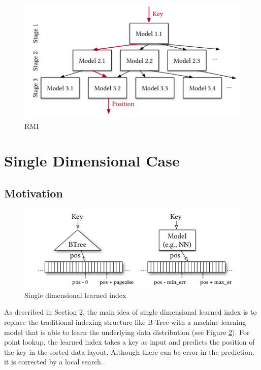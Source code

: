 \documentclass[sigconf,10pt]{acmart}
\begin{document}
\begin{figure}
  \includegraphics[scale=0.6]{../figures/RMI}
  \caption{RMI\cite{Learned_Index}}
  \label{RMI}
\end{figure}

\section{Single Dimensional Case}

\subsection{Motivation}

\begin{figure}[h]
  \includegraphics[scale=0.6]{../figures/single-dim-learned-index}
  \caption{Single dimensional learned index \cite{Learned_Index}}
  \label{single-dimensional-learned-index}
\end{figure}

As described in Section 2, the main idea of single dimensional learned index is to replace
the traditional indexing structure like B-Tree with a machine learning model that is able
to learn the underlying data distribution (see Figure \ref{single-dimensional-learned-index}).
For point lookup, the learned index takes a key as input and predicts the position of the key 
in the sorted data layout. Although there can be error in the prediction, it is corrected by a local search.
\end{document}
